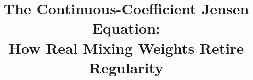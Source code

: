 \documentclass{article}
\theoremstyle{plain}
\theoremstyle{definition}
\begin{document}
%
%
%
%


\title{The Continuous-Coefficient Jensen Equation:\\
       How Real Mixing Weights Retire Regularity}

\end{document}
